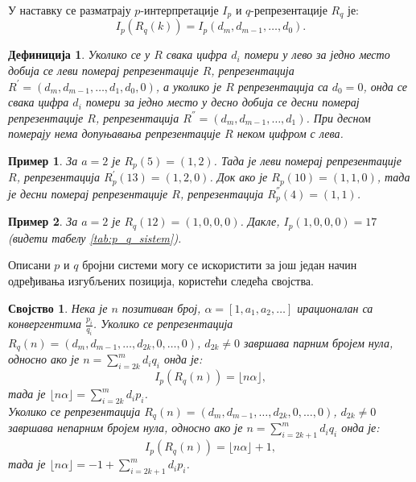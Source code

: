 \documentclass[a4paper]{article}
\newtheorem{example}{Пример}
\newtheorem{definition}{Дефиниција}
\newtheorem{property}{Својство}
\begin{document}
У наставку се разматрају $ p $-интерпретације $ I_{p} $ и $ q $-репрезентације $ R_{q} $ је:
	\begin{displaymath}
		I_{p}(R_{q}(k)) = I_{p}(d_{m}, d_{m-1}, \ldots, d_{0}).
	\end{displaymath}

\begin{definition}
	Уколико се у $ R $ свака цифра $ d_{i} $ помери у лево за једно место добија се  леви померај репрезентације $ R $, репрезентација $ R^{'} = (d_{m}, d_{m-1}, \ldots , d_{1}, d_{0}, 0) $, а уколико је $ R $ репрезентација  са $ d_{0} = 0 $, онда се свака цифра $ d_{i} $ помери за једно место у десно добија се десни померај репрезентације $ R $, репрезентација $ R^{''} = (d_{m}, d_{m-1}, \ldots , d_{1}) $. При десном померају нема допуњавања репрезентације $ R $ неком цифром с лева.
\end{definition}

\begin{example}
	За $ a = 2 $ је $ R_{p}(5) = (1, 2) $. Тада је леви померај репрезентације $ R $, репрезентација $ R^{'}_{p}(13) = (1, 2, 0) $. Док ако је $ R_{p}(10) = (1, 1, 0) $, тада је десни померај репрезентације $ R $, репрезентација $ R^{''}_{p}(4) = (1, 1) $.
\end{example}

\begin{example}
	За $ a = 2 $ је $ R_{q}(12) = (1, 0, 0, 0) $. Дакле, $ I_{p}(1, 0, 0, 0) = 17 $ (видети табелу \ref{tab:p_q_sistem}).
\end{example}

Описани $ p $ и $ q $ бројни системи могу се искористити за још један начин одређивања изгубљених позиција, користећи следећа својства.

\begin{property}
	\label{prop:r_q_nule}
	Нека је $ n $ позитиван број, $ \alpha = [1, a_{1}, a_{2}, \ldots] $ ирационалан са конвергентима $ {\frac{p_{i}}{q_{i}}} $. Уколико се репрезентација $ R_q(n) = (d_{m}, d_{m-1}, \ldots , d_{2k}, 0, \ldots, 0) $, $ d_{2k} \neq 0 $ завршава парним бројем нула, односно ако је $ n = \sum_{i = 2k}^{m} d_{i}q_{i} $ онда је:	
		\begin{displaymath}
			I_{p}(R_q(n)) = \lfloor n \alpha \rfloor,
		\end{displaymath}	
	тада је $ \lfloor n \alpha \rfloor = \sum_{i = 2k}^{m} d_{i}p_{i} $.\\	
	Уколико се репрезентација $ R_q(n) = (d_{m}, d_{m-1}, \ldots , d_{2k}, 0, \ldots, 0) $, $ d_{2k} \neq 0 $ завршава непарним бројем нула, односно ако је $ n = \sum_{i = 2k+1}^{m} d_{i}q_{i} $ онда је:
		\begin{displaymath}
			I_{p}(R_q(n)) = \lfloor n \alpha \rfloor + 1,
		\end{displaymath}
	тада је $ \lfloor n \alpha \rfloor = -1 + \sum_{i = 2k+1}^{m} d_{i}p_{i} $.	
\end{property}
\end{document}
